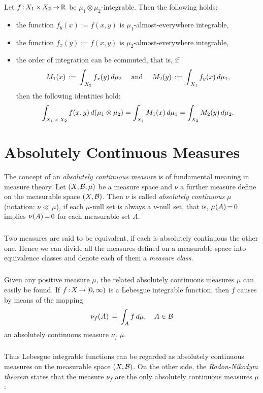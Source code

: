 \documentclass[11pt,twoside]{article}
\begin{document}
\begin{theorem}
Let $f {\,:\,} X_1 {\,\times\,} X_2 {\,\to\,} {\mathbb{R}}$ be $\mu_1 \otimes \mu_2$-integrable.
Then the following holds:

\begin{itemize}[leftmargin=12pt]
\item[1.]
the function $f_y(x) {:=} f(x,y)$ is $\mu_1$-almost-everywhere integrable,

\item[2.]
the function $f_x(y) {:=} f(x,y)$ is $\mu_2$-almost-everywhere integrable,

\item[3.]
the order of integration can be commuted,
that is,
if
\[
M_1(x) \,:=\, \int_{\,X_2} f_x(y) \, d \mu_2
\quad \mbox{ and } \quad
M_2(y) \,:=\, \int_{\,X_1} f_y(x) \, d \mu_1,
\]
then the following identities hold:
\[
\int_{X_1 {\,\times\,} X_2} f(x,y) \, d(\mu_1 \otimes \mu_2)
=
\int_{X_1} M_1(x) \, d \mu_1
=
\int_{X_2} M_2(y) \, d \mu_2.
\]
\end{itemize}
\end{theorem}

\section{Absolutely Continuous Measures}
The concept of an \textit{absolutely continuous measure} is of 
fundamental meaning in measure theory.
Let $(X,{\mathcal{B}},\mu)$ be a measure space
and $\nu$ a further measure define on the measurable space $(X,{\mathcal{B}})$.
Then $\nu$ is called \textit{absolutely continuous} {\wrt} $\mu$
(notation: $\nu \ll \mu$),
if each $\mu$-null set is always a $\nu$-null set,
that is, $\mu(A) {\,=\,} 0$ implies $\nu(A) {\,=\,} 0$ for each measurable set $A$.

\subparagraph{}
Two measures are said to be equivalent,
if each is absolutely continuous {\wrt} the other one.
Hence we can divide all the measures defined on a measurable space
into equivalence classes and denote each of them a \textit{measure class}.

\subparagraph{}
Given any positive measure $\mu$,
the related absolutely continuous measures {\wrt} $\mu$ can easily be found.
If $f {\,:\,} X {\,\to\,} [0,\infty)$ is a Lebesgue integrable function,
then $f$ causes by means of the mapping
\[
\nu_f(A) \,=\,
\int_{A} f \, d\mu, \quad A \in {\mathcal{B}}
\]
an absolutely continuous measure $\nu_f$ {\wrt} $\mu$.

\subparagraph{}
Thus Lebesgue integrable functions can be regarded as
absolutely continuous measures on the measurable space $(X,{\mathcal{B}})$.
On the other side,
the \textit{Radon-Nikodym} \textit{theorem} states that
the measure $\nu_f$ are the only absolutely continuous measures {\wrt} $\mu$:
\end{document}

